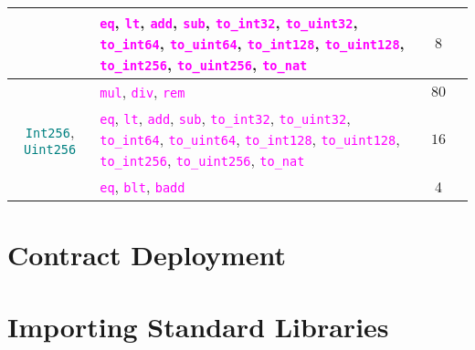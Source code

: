\documentclass[9pt]{article}
\begin{document}
\begin{table}[!hbt]
\begin{tabular}{|c|p{4.1cm}|c|p{5cm}|}
		 & \texttt{\textcolor{magenta}{eq}}, \texttt{\textcolor{magenta}{lt}},
		 \texttt{\textcolor{magenta}{add}}, \texttt{\textcolor{magenta}{sub}},
		 \texttt{\textcolor{magenta}{to\_int32}},
		 \texttt{\textcolor{magenta}{to\_uint32}},
		 \texttt{\textcolor{magenta}{to\_int64}},
		 \texttt{\textcolor{magenta}{to\_uint64}},
		 \texttt{\textcolor{magenta}{to\_int128}},
		 \texttt{\textcolor{magenta}{to\_uint128}},
		 \texttt{\textcolor{magenta}{to\_int256}},
		 \texttt{\textcolor{magenta}{to\_uint256}},
		 \texttt{\textcolor{magenta}{to\_nat}}
		 & $8$  & \\ \hline \hline
		\multirow{4}{*}{\texttt{\textcolor{teal}{Int256}},
		\texttt{\textcolor{teal}{Uint256}}} &
		\texttt{\textcolor{magenta}{mul}},
		 \texttt{\textcolor{magenta}{div}}, \texttt{\textcolor{magenta}{rem}} &
		 $ 80 $  & \\ \cline{2-4}
		 & \texttt{\textcolor{magenta}{eq}}, \texttt{\textcolor{magenta}{lt}},
		 \texttt{\textcolor{magenta}{add}}, \texttt{\textcolor{magenta}{sub}},
		 \texttt{\textcolor{magenta}{to\_int32}},
		 \texttt{\textcolor{magenta}{to\_uint32}},
		 \texttt{\textcolor{magenta}{to\_int64}},
		 \texttt{\textcolor{magenta}{to\_uint64}},
		 \texttt{\textcolor{magenta}{to\_int128}},
		 \texttt{\textcolor{magenta}{to\_uint128}},
		 \texttt{\textcolor{magenta}{to\_int256}},
		 \texttt{\textcolor{magenta}{to\_uint256}},
		 \texttt{\textcolor{magenta}{to\_nat}}
		 & $ 16 $  & \\ \hline \hline
		\texttt{\textcolor{teal}{BNum}} &
		\texttt{\textcolor{magenta}{eq}}, \texttt{\textcolor{magenta}{blt}},
		\texttt{\textcolor{magenta}{badd}} & 4  & \\ \hline 
	\end{tabular}
\end{table}



\section{Contract Deployment}

\section{Importing Standard Libraries}
\end{document}
